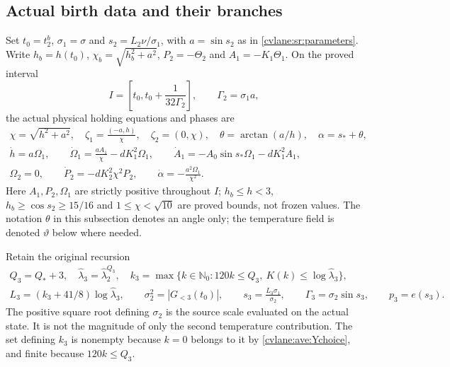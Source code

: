 \subsection{Actual birth data and their branches}

Set $t_0=t_2^b$, $\sigma_1=\sigma$ and
$s_2=L_2\nu/\sigma_1$, with $a=\sin s_2$ as in
\eqref{cvlane:sr:parameters}. Write $h_b=h(t_0)$, $\chi_b=\sqrt{h_b^2+a^2}$,
$P_2=-\Theta_2$ and $A_1=-K_1\Theta_1$. On the proved interval
\begin{equation}\label{cvlane:tg:interval}
 I=\left[t_0,t_0+\frac1{32\Gamma_2}\right],\qquad
 \Gamma_2=\sigma_1a,
\end{equation}
the actual physical holding equations and phases are
\begin{equation}\label{cvlane:tg:parent}
\begin{gathered}
 \chi=\sqrt{h^2+a^2},\quad
 \zeta_1=\frac{(-a,h)}\chi,\quad \zeta_2=(0,\chi),
 \quad\theta=\arctan(a/h),\quad\alpha=s_*+\theta,\\
 \dot h=a\Omega_1,\qquad
 \dot\Omega_1=\frac{aA_1}{\chi}-dK_1^2\Omega_1,\qquad
 \dot A_1=-A_0\sin s_*\Omega_1-dK_1^2 A_1,\\
 \Omega_2=0,\qquad
 \dot P_2=-dK_2^2\chi^2P_2,\qquad
 \dot\alpha=-\frac{a^2\Omega_1}{\chi^2}.
\end{gathered}
\end{equation}
Here $A_1,P_2,\Omega_1$ are strictly positive throughout $I$;
$h_b\leq h<3$, $h_b\geq\cos s_2\geq15/16$ and
$1\leq\chi<\sqrt{10}$ are proved bounds, not frozen values.
The notation $\theta$ in this subsection denotes an angle only;
the temperature field is denoted $\vartheta$ below where needed.

Retain the original recursion
\begin{equation}\label{cvlane:tg:third_design}
 \begin{gathered}
 Q_3=Q_*+3,\quad
 \widehat\lambda_3=\widehat\lambda_2^{Q_3},\quad
 k_3=\max\{k\in\mathbb N_0:120k\leq Q_3,
                  \ K(k)\leq\log\widehat\lambda_3\},\\
 L_3=(k_3+41/8)\log\widehat\lambda_3,\qquad
 \sigma_2^2=|G_{<3}(t_0)|,\qquad
 s_3=\frac{L_3\sigma_1}{\sigma_2},\qquad
 \Gamma_3=\sigma_2\sin s_3,\qquad p_3=e(s_3).
 \end{gathered}
\end{equation}
The positive square root defining $\sigma_2$ is the source scale
evaluated on the actual state. It is not the magnitude of only the
second temperature contribution. The set defining $k_3$ is nonempty
because $k=0$ belongs to it by \eqref{cvlane:ave:Ychoice}, and finite because
$120k\leq Q_3$.

